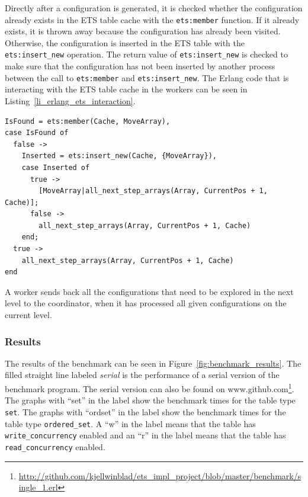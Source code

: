 \documentclass[aps,pre,preprint,nofootinbib]{revtex4}
\begin{document}
Directly after a configuration is generated, it is checked whether the configuration already exists in the ETS table cache with the \verb|ets:member| function.
If it already exists, it is thrown away because the configuration has already been visited.
Otherwise, the configuration is inserted in the ETS table with the \verb|ets:insert_new| operation.
The return value of \verb|ets:insert_new| is checked to make sure that the configuration has not been inserted by another process between the call to \verb|ets:member| and \verb|ets:insert_new|.
The Erlang code that is interacting with the ETS table cache in the workers can be seen in Listing~\ref{li_erlang_ets_interaction}. 

\lstset{basicstyle=\ttfamily, keywordstyle=\bfseries, language=erlang, caption=Worker code that is interacting with ETS, label=li_erlang_ets_interaction}
\begin{lstlisting}[float=htb]
IsFound = ets:member(Cache, MoveArray),
case IsFound of
  false ->
    Inserted = ets:insert_new(Cache, {MoveArray}),
    case Inserted of
      true ->
        [MoveArray|all_next_step_arrays(Array, CurrentPos + 1, Cache)];
      false ->
        all_next_step_arrays(Array, CurrentPos + 1, Cache)
    end;
  true ->
    all_next_step_arrays(Array, CurrentPos + 1, Cache)
end
\end{lstlisting}

A worker sends back all the configurations that need to be explored in the next level to the coordinator, when it has processed all given configurations on the current level.

\subsubsection{Results} 

The results of the benchmark can be seen in Figure~\ref{fig:benchmark_results}.
The filled straight line labeled \emph{serial} is the performance of a serial version of the benchmark program.
The serial version can also be found on www.github.com\footnote{\url{http://github.com/kjellwinblad/ets\_impl\_project/blob/master/benchmark/single\_1.erl}}.
The graphs with ``set'' in the label show the benchmark times for the table type \verb|set|.
The graphs with ``ordset'' in the label show the benchmark times for the table type \verb|ordered_set|.
A ``w'' in the label means that the table has \verb|write_concurrency| enabled and an ``r'' in the label means that the table has \verb|read_concurrency| enabled.
\end{document}
